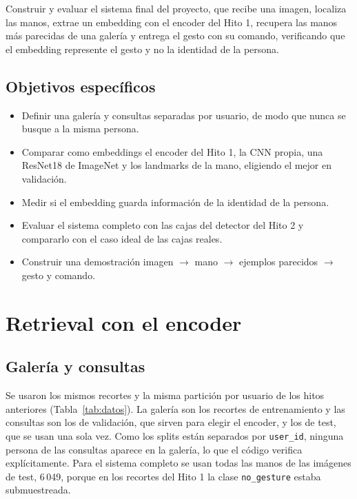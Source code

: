 \documentclass[11pt,letterpaper]{article}
\begin{document}
Construir y evaluar el sistema final del proyecto, que recibe una imagen, localiza las manos,
extrae un embedding con el encoder del Hito 1, recupera las manos más parecidas de una galería y
entrega el gesto con su comando, verificando que el embedding represente el gesto y no la identidad
de la persona.

\subsection{Objetivos específicos}

\begin{itemize}
    \item Definir una galería y consultas separadas por usuario, de modo que nunca se busque a la
    misma persona.
    \item Comparar como embeddings el encoder del Hito 1, la CNN propia, una ResNet18 de ImageNet y
    los landmarks de la mano, eligiendo el mejor en validación.
    \item Medir si el embedding guarda información de la identidad de la persona.
    \item Evaluar el sistema completo con las cajas del detector del Hito 2 y compararlo con el caso
    ideal de las cajas reales.
    \item Construir una demostración imagen $\rightarrow$ mano $\rightarrow$ ejemplos parecidos
    $\rightarrow$ gesto y comando.
\end{itemize}

\newpage
\section{Retrieval con el encoder}

\subsection{Galería y consultas}

Se usaron los mismos recortes y la misma partición por usuario de los hitos anteriores
(Tabla~\ref{tab:datos}). La galería son los recortes de entrenamiento y las consultas son los de
validación, que sirven para elegir el encoder, y los de test, que se usan una sola vez. Como los
splits están separados por \texttt{user\_id}, ninguna persona de las consultas aparece en la
galería, lo que el código verifica explícitamente. Para el sistema completo se usan todas las manos
de las imágenes de test, 6\,049, porque en los recortes del Hito 1 la clase \texttt{no\_gesture}
estaba submuestreada.
\end{document}
